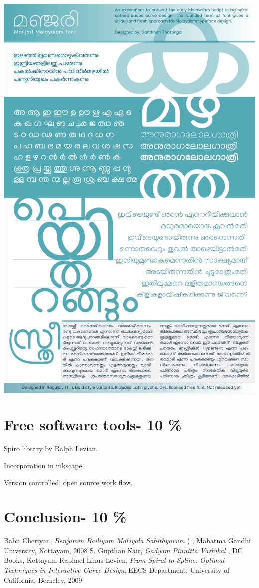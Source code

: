 \documentclass[10pt]{article}
\begin{document}
\includegraphics[width=\textwidth]{images/Manjari-Specimen.pdf}

\section{Free software tools- 10 \%}

Spiro library by Ralph Levian.

Incorporation in inkscape

Version controlled, open source work flow.

\section{Conclusion- 10 \%}

\begin{thebibliography}{99}
	 Babu Cheriyan, \textit{Benjamin Bailiyum Malayala Sahithyavum} {) }, Mahatma Gandhi University, Kottayam, 2008
	 S. Gupthan Nair, \textit{Gadyam Pinnitta Vazhikal}{ }, DC Books, Kottayam 
  Raphael Linus Levien,  \textit{From Spiral to Spline: Optimal Techniques in Interactive Curve Design}, EECS Department, University of California, Berkeley, 2009
	
\end{thebibliography}
\end{document}
